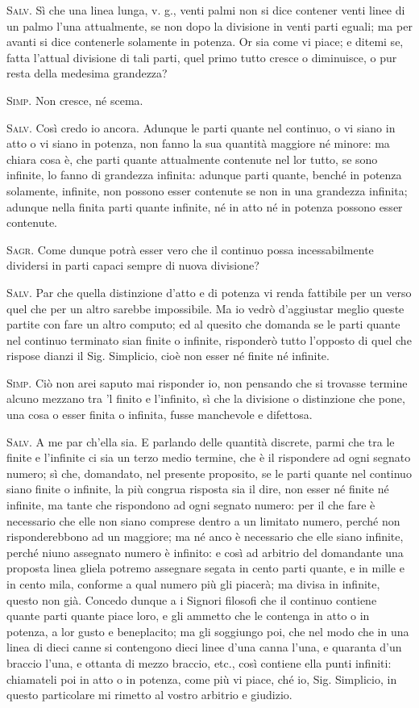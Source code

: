 \documentclass[11pt,twoside,openany]{book}
\newcommand{\speaker}[1]{\textcolor{rubric}{\textsc{#1}}\space}
\begin{document}
\speaker{Salv.} Sì che una linea lunga, v. g., venti palmi non si dice contener venti linee di un palmo l'una attualmente, se non dopo la divisione in venti parti eguali; ma per avanti si dice contenerle solamente in potenza. Or sia come vi piace; e ditemi se, fatta l'attual divisione di tali parti, quel primo tutto cresce o diminuisce, o pur resta della medesima grandezza?

\speaker{Simp.} Non cresce, né scema.

\speaker{Salv.} Così credo io ancora. Adunque le parti quante nel continuo, o vi siano in atto o vi siano in potenza, non fanno la sua quantità maggiore né minore: ma chiara cosa è, che parti quante attualmente contenute nel lor tutto, se sono infinite, lo fanno di grandezza infinita: adunque parti quante, benché in potenza solamente, infinite, non possono esser contenute se non in una grandezza infinita; adunque nella finita parti quante infinite, né in atto né in potenza possono esser contenute.

\speaker{Sagr.} Come dunque potrà esser vero che il continuo possa incessabilmente dividersi in parti capaci sempre di nuova divisione?

\speaker{Salv.} Par che quella distinzione d'atto e di potenza vi renda fattibile per un verso quel che per un altro sarebbe impossibile. Ma io vedrò d'aggiustar meglio queste partite con fare un altro computo; ed al quesito che domanda se le parti quante nel continuo terminato sian finite o infinite, risponderò tutto l'opposto di quel che rispose dianzi il Sig. Simplicio, cioè non esser né finite né infinite.

\speaker{Simp.} Ciò non arei saputo mai risponder io, non pensando che si trovasse termine alcuno mezzano tra 'l finito e l'infinito, sì che la divisione o distinzione che pone, una cosa o esser finita o infinita, fusse manchevole e difettosa.

\speaker{Salv.} A me par ch'ella sia. E parlando delle quantità discrete, parmi che tra le finite e l'infinite ci sia un terzo medio termine, che è il rispondere ad ogni segnato numero; sì che, domandato, nel presente proposito, se le parti quante nel continuo siano finite o infinite, la più congrua risposta sia il dire, non esser né finite né infinite, ma tante che rispondono ad ogni segnato numero: per il che fare è necessario che elle non siano comprese dentro a un limitato numero, perché non risponderebbono ad un maggiore; ma né anco è necessario che elle siano infinite, perché niuno assegnato numero è infinito: e così ad arbitrio del domandante una proposta linea gliela potremo assegnare segata in cento parti quante, e in mille e in cento mila, conforme a qual numero più gli piacerà; ma divisa in infinite, questo non già. Concedo dunque a i Signori filosofi che il continuo contiene quante parti quante piace loro, e gli ammetto che le contenga in atto o in potenza, a lor gusto e beneplacito; ma gli soggiungo poi, che nel modo che in una linea di dieci canne si contengono dieci linee d'una canna l'una, e quaranta d'un braccio l'una, e ottanta di mezzo braccio, etc., così contiene ella punti infiniti: chiamateli poi in atto o in potenza, come più vi piace, ché io, Sig. Simplicio, in questo particolare mi rimetto al vostro arbitrio e giudizio.
\end{document}

